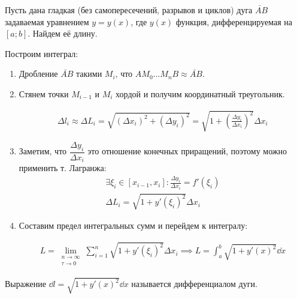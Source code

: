 
Пусть дана гладкая (без самопересечений, разрывов и циклов) дуга \(\breve{AB}\)
задаваемая уравнением \(y = y(x)\), где \(y(x)\) функция, дифференцируемая на
\([a; b]\). Найдем её длину.

Построим интеграл:
\begin{enumerate}
  \item Дробление \(\breve{AB}\) такими \(M_{i}\), что
  \(A M_{0} \dotsc M_{n} B \approx \breve{AB}\).

  \item Стянем точки \(M_{i - 1}\) и \(M_{i}\) хордой и получим координатный
  треугольник.

  \begin{multicols}{2}
    \begin{align*}
      \Delta l_{i}
      \approx \Delta L_{i}
      = \sqrt{(\Delta x_{i})^2 + (\Delta y_{i})^2}
      = \sqrt{1 + \left(\frac{\Delta y_{i}}{\Delta x_{i}}\right)^2} \Delta x_{i}
    \end{align*}
    \columnbreak

    
  \end{multicols}

  \item Заметим, что \(\dfrac{\Delta y_{i}}{\Delta x_{i}}\) это отношение
  конечных приращений, поэтому можно применить т. Лагранжа:
  \begin{align*}
    \exists \xi_{i} \in [x_{i - 1}, x_{i}] \colon
      \frac{\Delta y_{i}}{\Delta x_{i}} = f'(\xi_{i})
    \\
    \Delta L_{i}
    = \sqrt{1 + y'(\xi_{i})^2} \Delta x_{i}
  \end{align*}
  
  \item Составим предел интегральных сумм и перейдем к интегралу:

  \begin{align*}
    L = \lim_{\substack{n \to \infty \\ \tau \to 0}}
      \sum_{i = 1}^{n} \sqrt{1 + y'(\xi_{i})^2} \Delta x_{i}
    \implies L = \int_{a}^{b} \sqrt{1 + y'(x)^2} \dd x
  \end{align*}
\end{enumerate}

\begin{remark}
  Выражение \(\dd l = \sqrt{1 + y'(x)^2} \dd x\) называется дифференциалом дуги.
\end{remark}